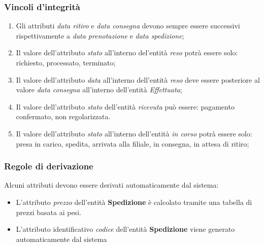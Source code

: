 \subsubsection*{Vincoli d'integrità}
\begin{enumerate}
  \item Gli attributi \textit{data ritiro} e \textit{data consegna} devono sempre essere successivi rispettivamente a \textit{data prenotazione} e \textit{data spedizione};
	\item Il valore dell'attributo \textit{stato} all'interno del'entità \textit{reso} potrà essere solo: richiesto, processato, terminato;
	\item Il valore dell'attributo \textit{data} all'interno dell'entità \textit{reso} deve essere posteriore al valore \textit{data consegna} all'interno dell'entità \textit{Effettuata};
	\item Il valore dell'attributo \textit{stato} dell'entità \textit{ricevuta} può essere: pagamento confermato, non regolarizzata. 
	\item Il valore dell'attributo \textit{stato} all'interno dell'entità \textit{in corso} potrà essere solo: presa in carico, spedita, arrivata alla filiale, in consegna, in attesa di ritiro;
	
\end{enumerate}

\subsubsection*{Regole di derivazione}
Alcuni attributi devono essere derivati automaticamente dal sistema:
\begin{itemize}
  \item L'attributo \textit{prezzo} dell'entità \textbf{Spedizione} è calcolato tramite una tabella di prezzi basata ai pesi.
  \item L'attributo identificativo \textit{codice} dell'entità \textbf{Spedizione} viene generato automaticamente dal sistema\
  
\end{itemize}
